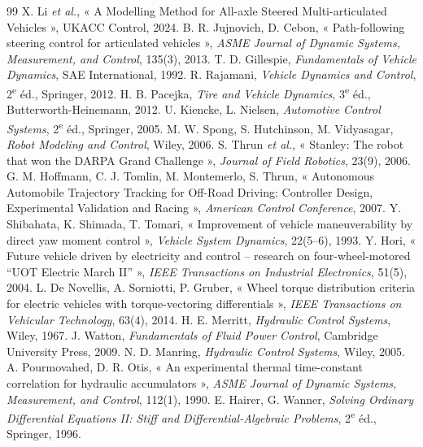 \documentclass[11pt,a4paper]{article}
\begin{document}
\begin{thebibliography}{99}
 X. Li \emph{et al.}, « A Modelling Method for All-axle Steered Multi-articulated Vehicles », UKACC Control, 2024.
 B. R. Jujnovich, D. Cebon, « Path-following steering control for articulated vehicles », \emph{ASME Journal of Dynamic Systems, Measurement, and Control}, 135(3), 2013.
 T. D. Gillespie, \emph{Fundamentals of Vehicle Dynamics}, SAE International, 1992.
 R. Rajamani, \emph{Vehicle Dynamics and Control}, 2\textsuperscript{e} éd., Springer, 2012.
 H. B. Pacejka, \emph{Tire and Vehicle Dynamics}, 3\textsuperscript{e} éd., Butterworth-Heinemann, 2012.
 U. Kiencke, L. Nielsen, \emph{Automotive Control Systems}, 2\textsuperscript{e} éd., Springer, 2005.
 M. W. Spong, S. Hutchinson, M. Vidyasagar, \emph{Robot Modeling and Control}, Wiley, 2006.
 S. Thrun \emph{et al.}, « Stanley: The robot that won the DARPA Grand Challenge », \emph{Journal of Field Robotics}, 23(9), 2006.
 G. M. Hoffmann, C. J. Tomlin, M. Montemerlo, S. Thrun, « Autonomous Automobile Trajectory Tracking for Off-Road Driving: Controller Design, Experimental Validation and Racing », \emph{American Control Conference}, 2007.
 Y. Shibahata, K. Shimada, T. Tomari, « Improvement of vehicle maneuverability by direct yaw moment control », \emph{Vehicle System Dynamics}, 22(5--6), 1993.
 Y. Hori, « Future vehicle driven by electricity and control -- research on four-wheel-motored “UOT Electric March II” », \emph{IEEE Transactions on Industrial Electronics}, 51(5), 2004.
 L. De Novellis, A. Sorniotti, P. Gruber, « Wheel torque distribution criteria for electric vehicles with torque-vectoring differentials », \emph{IEEE Transactions on Vehicular Technology}, 63(4), 2014.
 H. E. Merritt, \emph{Hydraulic Control Systems}, Wiley, 1967.
 J. Watton, \emph{Fundamentals of Fluid Power Control}, Cambridge University Press, 2009.
 N. D. Manring, \emph{Hydraulic Control Systems}, Wiley, 2005.
 A. Pourmovahed, D. R. Otis, « An experimental thermal time-constant correlation for hydraulic accumulators », \emph{ASME Journal of Dynamic Systems, Measurement, and Control}, 112(1), 1990.
 E. Hairer, G. Wanner, \emph{Solving Ordinary Differential Equations II: Stiff and Differential-Algebraic Problems}, 2\textsuperscript{e} éd., Springer, 1996.

\end{thebibliography}
\end{document}
